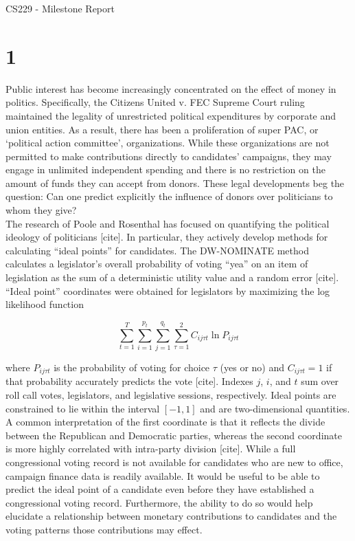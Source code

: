 \documentclass[10]{article}
\begin{document}
\begin{center}
CS229 - Milestone Report \\
\end{center}
\section*{1}
Public interest has become increasingly concentrated on the effect of money in politics. Specifically, the Citizens United v. FEC Supreme Court ruling maintained the legality of unrestricted political expenditures by corporate and union entities. As a result, there has been a proliferation of super PAC, or ‘political action committee’,  organizations. While these organizations are not permitted to make contributions directly to candidates’ campaigns, they may engage in unlimited independent spending and there is no restriction on the amount of funds they can accept from donors. These legal developments beg the question: Can one predict explicitly the influence of donors over politicians to whom they give? \\

The research of Poole and Rosenthal has focused on quantifying the political ideology of politicians [cite]. In particular, they actively develop methods for calculating “ideal points” for candidates. The DW-NOMINATE method calculates a legislator’s overall probability of voting “yea” on an item of legislation as the sum of a deterministic utility value and a random error [cite]. “Ideal point” coordinates were obtained for legislators by maximizing the log likelihood function

\[ \sum_{t=1}^{T} \sum_{i=1}^{p_t} \sum_{j=1}^{q_t} \sum_{\tau = 1}^{2} C_{ij \tau t} \ln P_{ij \tau t} \]

\noindent where $P_{ij \tau t}$ is the probability of voting for choice $\tau$ (yes or no) and $C_{ij \tau t} = 1$ if that probability accurately predicts the vote [cite]. Indexes $j$, $i$, and $t$ sum over roll call votes, legislators, and legislative sessions, respectively. Ideal points are constrained to lie within the interval $\left[ -1,1 \right]$ and are two-dimensional quantities. A common interpretation of the first coordinate is that it reflects the divide between the Republican and Democratic parties, whereas the second coordinate is more highly correlated with intra-party division [cite]. While a full congressional voting record is not available for candidates who are new to office, campaign finance data is readily available. It would be useful to be able to predict the ideal point of a candidate even before they have established a congressional voting record. Furthermore, the ability to do so would help elucidate a relationship between monetary contributions to candidates and the voting patterns those contributions may effect.\\
\end{document}
